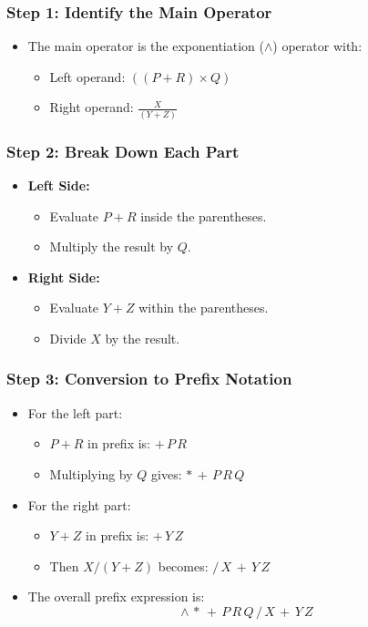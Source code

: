 \documentclass[12pt]{article}
\begin{document}
\subsubsection*{Step 1: Identify the Main Operator}
\begin{itemize}[label=$\bullet$]
    \item The main operator is the exponentiation ($\wedge$) operator with:
          \begin{itemize}[label=$\circ$]
              \item Left operand: $((P+R) \times Q)$
              \item Right operand: $\frac{X}{(Y+Z)}$
          \end{itemize}
\end{itemize}

\subsubsection*{Step 2: Break Down Each Part}
\begin{itemize}[label=$\bullet$]
    \item \textbf{Left Side:}
          \begin{itemize}[label=$\circ$]
              \item Evaluate $P+R$ inside the parentheses.
              \item Multiply the result by $Q$.
          \end{itemize}
    \item \textbf{Right Side:}
          \begin{itemize}[label=$\circ$]
              \item Evaluate $Y+Z$ within the parentheses.
              \item Divide $X$ by the result.
          \end{itemize}
\end{itemize}

\subsubsection*{Step 3: Conversion to Prefix Notation}
\begin{itemize}[label=$\bullet$]
    \item For the left part:
          \begin{itemize}[label=$\circ$]
              \item $P+R$ in prefix is: $+\,P\,R$
              \item Multiplying by $Q$ gives: $*\,+\,P\,R\,Q$
          \end{itemize}
    \item For the right part:
          \begin{itemize}[label=$\circ$]
              \item $Y+Z$ in prefix is: $+\,Y\,Z$
              \item Then $X/(Y+Z)$ becomes: $/\,X\,+\,Y\,Z$
          \end{itemize}
    \item The overall prefix expression is:
          \[
              \wedge\,*\,+\,P\,R\,Q\,/\,X\,+\,Y\,Z
          \]
\end{itemize}
\end{document}
